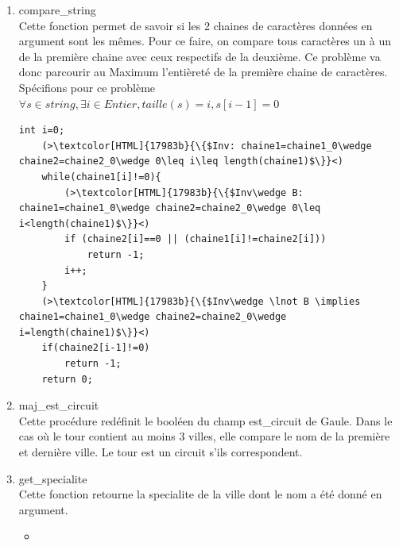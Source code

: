 \documentclass[a4paper, 11pt, oneside]{article}
\begin{document}
\begin{enumerate}
\begin{itemize}
    \end{itemize}
    \item compare\_string
    \\Cette fonction permet de savoir si les 2 chaines de caractères données en argument 
    sont les mêmes. Pour ce faire, on compare tous caractères un à un de la première chaine 
    avec ceux respectifs de la deuxième.
    Ce problème va donc parcourir au Maximum l'entièreté de la première chaine de caractères.
    \\Spécifions pour ce problème $\forall s\in string, \exists i\in Entier, taille(s)=i, s[i-1]=0$
    \begin{lstlisting}[caption = {Boucle pour comparer les 2 chaines de caractères}]
    int i=0;
    (>\textcolor[HTML]{17983b}{\{$Inv: chaine1=chaine1_0\wedge chaine2=chaine2_0\wedge 0\leq i\leq length(chaine1)$\}}<)
    while(chaine1[i]!=0){
        (>\textcolor[HTML]{17983b}{\{$Inv\wedge B: chaine1=chaine1_0\wedge chaine2=chaine2_0\wedge 0\leq i<length(chaine1)$\}}<)
        if (chaine2[i]==0 || (chaine1[i]!=chaine2[i]))
            return -1;
        i++;
    }
    (>\textcolor[HTML]{17983b}{\{$Inv\wedge \lnot B \implies chaine1=chaine1_0\wedge chaine2=chaine2_0\wedge i=length(chaine1)$\}}<)
    if(chaine2[i-1]!=0)
        return -1;
    return 0;
    \end{lstlisting}
    \item maj\_est\_circuit
    \\Cette procédure redéfinit le booléen du champ est\_circuit de Gaule. Dans le cas où le tour contient
    au moins 3 villes, elle compare le nom de la première et dernière ville. Le tour est un circuit s'ils 
    correspondent.
    \item get\_specialite
    \\Cette fonction retourne la specialite de la ville dont le nom a été donné en argument. 
    \begin{itemize}
        \item 
    \end{itemize}

\end{enumerate}
\end{document}

